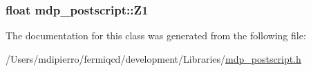 \label{classmdp__postscript_a5c27b031c6f79593b476dfa6a69e146f}
\hypertarget{classmdp__postscript_ac512287091dcecae1a549d005083554f}{
\subsubsection[{Z1}]{\setlength{\rightskip}{0pt plus 5cm}float {\bf mdp\_\-postscript::Z1}}}
\label{classmdp__postscript_ac512287091dcecae1a549d005083554f}


The documentation for this class was generated from the following file:\begin{DoxyCompactItemize}
\item 
/Users/mdipierro/fermiqcd/development/Libraries/\hyperlink{mdp__postscript_8h}{mdp\_\-postscript.h}\end{DoxyCompactItemize}
